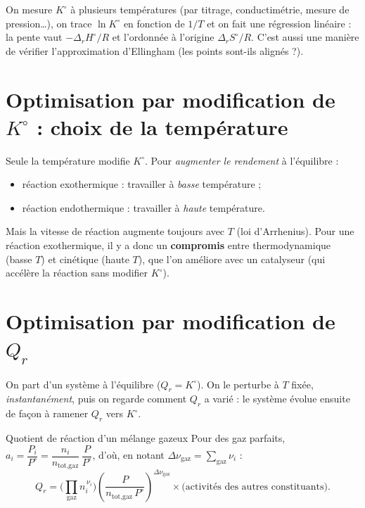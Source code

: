 \begin{methode}
On mesure $K^\circ$ à plusieurs températures (par titrage, conductimétrie, mesure de pression\dots), on trace $\ln K^\circ$ en fonction de $1/T$ et on fait une régression linéaire : la pente vaut $-\Delta_rH^\circ/R$ et l'ordonnée à l'origine $\Delta_rS^\circ/R$. C'est aussi une manière de vérifier l'approximation d'Ellingham (les points sont-ils alignés ?).
\end{methode}

\section{Optimisation par modification de $K^\circ$ : choix de la température}

Seule la température modifie $K^\circ$. Pour \emph{augmenter le rendement} à l'équilibre :
\begin{itemize}
  \item réaction exothermique : travailler à \emph{basse} température ;
  \item réaction endothermique : travailler à \emph{haute} température.
\end{itemize}
Mais la vitesse de réaction augmente toujours avec $T$ (loi d'Arrhenius). Pour une réaction exothermique, il y a donc un \textbf{compromis} entre thermodynamique (basse $T$) et cinétique (haute $T$), que l'on améliore avec un catalyseur (qui accélère la réaction sans modifier $K^\circ$).

\section{Optimisation par modification de $Q_r$}

On part d'un système à l'équilibre ($Q_r = K^\circ$). On le perturbe à $T$ fixée, \emph{instantanément}, puis on regarde comment $Q_r$ a varié : le système évolue ensuite de façon à ramener $Q_r$ vers $K^\circ$.

\begin{resultat}{Quotient de réaction d'un mélange gazeux}
Pour des gaz parfaits, $a_i = \dfrac{P_i}{P^\circ} = \dfrac{n_i}{n_{\text{tot,gaz}}}\,\dfrac{P}{P^\circ}$, d'où, en notant $\Delta\nu_{\text{gaz}} = \sum_{\text{gaz}}\nu_i$ :
\[ Q_r = \Big(\prod_{\text{gaz}}n_i^{\,\nu_i}\Big)\left(\frac{P}{n_{\text{tot,gaz}}\,P^\circ}\right)^{\Delta\nu_{\text{gaz}}}\times\big(\text{activités des autres constituants}\big). \]
\end{resultat}

